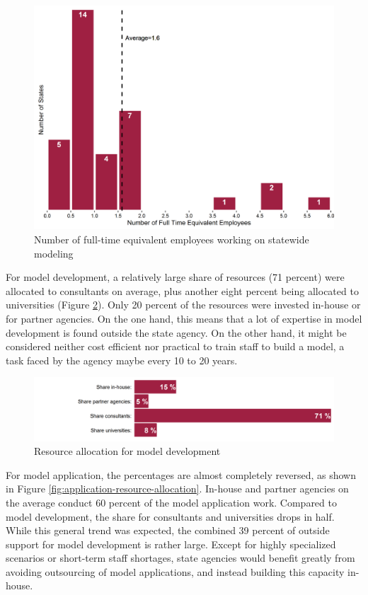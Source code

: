 \begin{figure}   %
\centering
\includegraphics[width=5.8in]{graphics/36-staffing}
\caption{Number of full-time equivalent employees working on statewide modeling}
\label{fig:staffing}
\end{figure}

For model development, a relatively large share of resources (71 percent) were allocated to consultants on average, plus another eight percent being allocated to universities (Figure \ref{fig:resource-allocation}). Only 20 percent of the resources were invested in-house or for partner agencies. On the one hand, this means that a lot of expertise in model development is found outside the state agency. On the other hand, it might be considered neither cost efficient nor practical to train staff to build a model, a task faced by the agency maybe every 10 to 20 years.

\begin{figure}   %
\centering
\includegraphics[width=6.4in]{graphics/37-development-resource-allocation}
\caption{Resource allocation for model development}
\label{fig:resource-allocation}
\end{figure}

For model application, the percentages are almost completely reversed, as shown in Figure \ref{fig:application-resource-allocation}. In-house and partner agencies on the average conduct 60 percent of the model application work. Compared to model development, the share for consultants and universities drops in half. While this general trend was expected, the combined 39 percent of outside support for model development is rather large. Except for highly specialized scenarios or short-term staff shortages, state agencies would benefit greatly from avoiding outsourcing of model applications, and instead building this capacity in-house.

